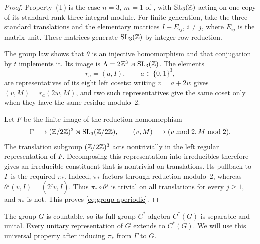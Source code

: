 \begin{proof}
Property~(T) is the case $n=3$, $m=1$ of
\cite[Proposition~1.1]{deCornulier2007}, with $\operatorname{SL}_3(\mathbb Z)$ acting on one
copy of its standard rank-three integral module.  For finite generation,
take the three standard translations and the elementary matrices
$I+E_{ij}$, $i\ne j$, where $E_{ij}$ is the matrix unit.  These matrices
generate $\operatorname{SL}_3(\mathbb Z)$ by integer row reduction.

The group law shows that $\theta$ is an injective homomorphism and that
conjugation by $t$ implements it.  Its image is
$\Lambda=2\mathbb Z^3\rtimes\operatorname{SL}_3(\mathbb Z)$.  The elements
\[
 r_a=(a,I),\qquad a\in\{0,1\}^3,
\]
are representatives of its eight left cosets: writing $v=a+2w$ gives
$(v,M)=r_a(2w,M)$, and two such representatives give the same coset
only when they have the same residue modulo~$2$.

Let $F$ be the finite image of the reduction homomorphism
\[
 \Gamma\longrightarrow (\mathbb Z/2\mathbb Z)^3\rtimes\operatorname{SL}_3(\mathbb Z/2\mathbb Z),
 \qquad (v,M)\longmapsto(v\bmod2,M\bmod2).
\]
The translation subgroup $(\mathbb Z/2\mathbb Z)^3$ acts nontrivially in the left
regular representation of $F$.  Decomposing this representation into
irreducibles therefore gives an irreducible constituent that is
nontrivial on translations.  Its pullback to $\Gamma$ is the required
$\pi_*$.  Indeed, $\pi_*$ factors through reduction modulo~$2$, whereas
$\theta^j(v,I)=(2^jv,I)$.  Thus $\pi_*\circ\theta^j$ is trivial on all
translations for every $j\geq1$, and $\pi_*$ is not.  This proves
\eqref{eq:group-aperiodic}.
\end{proof}

The group $G$ is countable, so its full group $C^*$-algebra $C^*(G)$ is
separable and unital.  Every unitary representation of $G$ extends to
$C^*(G)$.  We will use this universal property after inducing $\pi_*$
from $\Gamma$ to $G$.
